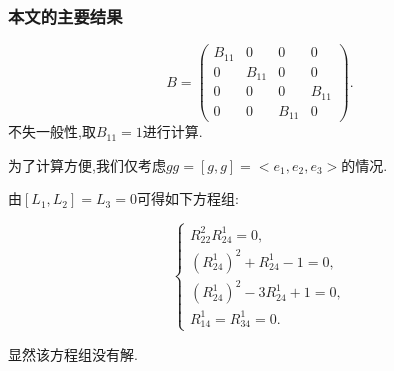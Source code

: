 \documentclass[aspectratio=169, 10pt, utf8, mathserif]{beamer}
\begin{document}
\begin{frame}
	\frametitle{本文的主要结果}
	
	$$B=\left(\begin{smallmatrix}
	B_{11} & 0 & 0 & 0 \\
	0 & B_{11} & 0 & 0 \\
	0 & 0 & 0 & B_{11} \\
	0 & 0 & B_{11} & 0
	\end{smallmatrix}\right).
	$$
	不失一般性,取$B_{11}=1$进行计算.
	
	为了计算方便,我们仅考虑$gg=[g, g]=<e_{1}, e_{2}, e_{3}>$的情况.
	
	由$[L_1,L_2]=L_3=0$可得如下方程组:

	\begin{equation*}\left\{
		\begin{array}{l}
		R_{22}^{2} R_{24}^{1}=0, \\
		\left(R_{24}^{1}\right)^{2}+R_{24}^{1}-1=0, \\
		\left(R_{24}^{1}\right)^{2}-3 R_{24}^{1}+1=0, \\
		R_{14}^{1}=R_{34}^{1}=0.
		\end{array}
		\right.
		\end{equation*}
		
		显然该方程组没有解.

\end{frame}
	
\end{document}
